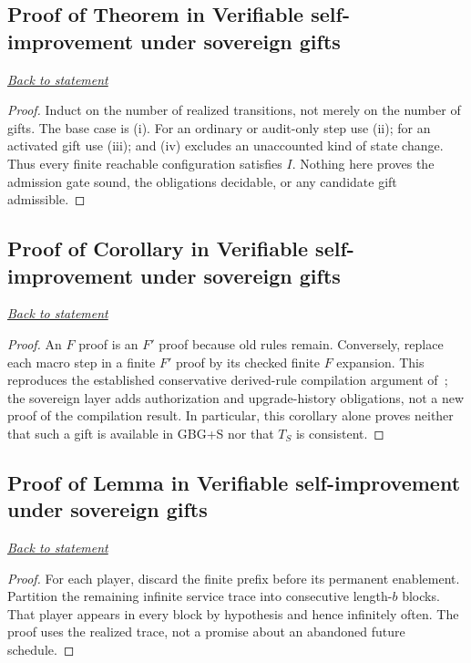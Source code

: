 \documentclass[11pt,letterpaper]{article}
\theoremstyle{definition}\newtheorem{definition}[theorem]{Definition}\newtheorem{example}[theorem]{Example}
\theoremstyle{remark}\newtheorem{remark}[theorem]{Remark}
\newcommand{\backlink}[1]{\noindent\hyperref[#1]{\textit{Back to statement}}\par\smallskip}
\begin{document}
\subsection{Proof of Theorem in Verifiable self-improvement under sovereign gifts}\label{br:mvsi:proof:1}\backlink{br:mvsi:stmt:1}
\begin{proof}
Induct on the number of realized transitions, not merely on the number of gifts. The base case is (i). For an ordinary or audit-only step use (ii); for an activated gift use (iii); and (iv) excludes an unaccounted kind of state change. Thus every finite reachable configuration satisfies $I$. Nothing here proves the admission gate sound, the obligations decidable, or any candidate gift admissible.
\end{proof}

\subsection{Proof of Corollary in Verifiable self-improvement under sovereign gifts}\label{br:mvsi:proof:2}\backlink{br:mvsi:stmt:2}
\begin{proof}
An $F$ proof is an $F'$ proof because old rules remain. Conversely, replace each macro step in a finite $F'$ proof by its checked finite $F$ expansion. This reproduces the established conservative derived-rule compilation argument of~\cite{mvsi:Successor}; the sovereign layer adds authorization and upgrade-history obligations, not a new proof of the compilation result. In particular, this corollary alone proves neither that such a gift is available in GBG+S nor that $T_S$ is consistent.\end{proof}

\subsection{Proof of Lemma in Verifiable self-improvement under sovereign gifts}\label{br:mvsi:proof:3}\backlink{br:mvsi:stmt:3}
\begin{proof}
For each player, discard the finite prefix before its permanent enablement. Partition the remaining infinite service trace into consecutive length-$b$ blocks. That player appears in every block by hypothesis and hence infinitely often. The proof uses the realized trace, not a promise about an abandoned future schedule.\end{proof}
\end{document}
